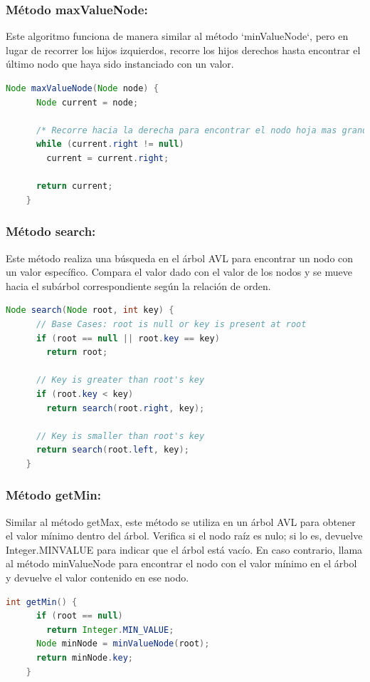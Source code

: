 \documentclass{article}
\begin{document}

  \subsubsection{Método maxValueNode: }Este algoritmo funciona de manera similar al método `minValueNode`, 
  pero en lugar de recorrer los hijos izquierdos, recorre los hijos derechos hasta encontrar el último nodo 
  que haya sido instanciado con un valor.
  \begin{lstlisting}[language=Java, caption={Ejemplo de código Java}]
    Node maxValueNode(Node node) {
      Node current = node;

      /* Recorre hacia la derecha para encontrar el nodo hoja mas grande */
      while (current.right != null)
        current = current.right;

      return current;
    }
  \end{lstlisting}
  

  \subsubsection{Método search: }Este método realiza una búsqueda en el árbol AVL para encontrar un nodo 
  con un valor específico. Compara el valor dado con el valor de los nodos y se mueve hacia el subárbol 
  correspondiente según la relación de orden.
  \begin{lstlisting}[language=Java, caption={Ejemplo de código Java}]
    Node search(Node root, int key) {
      // Base Cases: root is null or key is present at root
      if (root == null || root.key == key)
        return root;

      // Key is greater than root's key
      if (root.key < key)
        return search(root.right, key);

      // Key is smaller than root's key
      return search(root.left, key);
    }
  \end{lstlisting}
  

  \subsubsection{Método getMin: }Similar al método getMax, este método se utiliza en un árbol AVL para obtener el 
  valor mínimo dentro del árbol. Verifica si el nodo raíz es nulo; si lo es, devuelve Integer.MINVALUE para 
  indicar que el árbol está vacío. En caso contrario, llama al método minValueNode para encontrar el nodo con el 
  valor mínimo en el árbol y devuelve el valor contenido en ese nodo.
  \begin{lstlisting}[language=Java, caption={Ejemplo de código Java}]
    int getMin() {
      if (root == null)
        return Integer.MIN_VALUE;
      Node minNode = minValueNode(root);
      return minNode.key;
    }
  \end{lstlisting}
  
\end{document}
